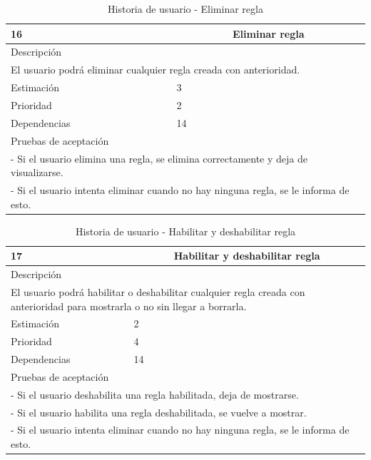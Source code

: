 \begin{table}[H]
	\begin{center}
		\begin{tabular} {|l|c|l|}
			\hline
			16 & \multicolumn{2}{c|}{Eliminar regla} \\ \hline \hline
			\multicolumn{3}{|l|}{Descripción} \\ \hline
			\multicolumn{3}{|p{12cm}|}{El usuario podrá eliminar cualquier regla creada con anterioridad.} \\ \hline
			\multicolumn{2}{|l|}{Estimación} & 3 \\ \hline
			\multicolumn{2}{|l|}{Prioridad} & 2 \\ \hline
			\multicolumn{2}{|l|}{Dependencias} & 14 \\ \hline
			\multicolumn{3}{|l|}{Pruebas de aceptación} \\ \hline
			\multicolumn{3}{|p{12cm}|}{ - Si el usuario elimina una regla, se elimina correctamente y deja de visualizarse.} \\
			\multicolumn{3}{|p{12cm}|}{ - Si el usuario intenta eliminar cuando no hay ninguna regla, se le informa de esto.} \\ \hline
		\end{tabular}
	\end{center}
	\caption{Historia de usuario - Eliminar regla}
	\label{tab:hu_eliminar_regla}
\end{table}

\begin{table}[H]
	\begin{center}
		\begin{tabular} {|l|c|l|}
			\hline
			17 & \multicolumn{2}{c|}{Habilitar y deshabilitar regla} \\ \hline \hline
			\multicolumn{3}{|l|}{Descripción} \\ \hline
			\multicolumn{3}{|p{12cm}|}{El usuario podrá habilitar o deshabilitar cualquier regla creada con anterioridad para mostrarla o no sin llegar a borrarla.} \\ \hline
			\multicolumn{2}{|l|}{Estimación} & 2 \\ \hline
			\multicolumn{2}{|l|}{Prioridad} & 4 \\ \hline
			\multicolumn{2}{|l|}{Dependencias} & 14 \\ \hline
			\multicolumn{3}{|l|}{Pruebas de aceptación} \\ \hline
			\multicolumn{3}{|p{12cm}|}{ - Si el usuario deshabilita una regla habilitada, deja de mostrarse.} \\
			\multicolumn{3}{|p{12cm}|}{ - Si el usuario habilita una regla deshabilitada, se vuelve a mostrar.} \\
			\multicolumn{3}{|p{12cm}|}{ - Si el usuario intenta eliminar cuando no hay ninguna regla, se le informa de esto.} \\ \hline
		\end{tabular}
	\end{center}
	\caption{Historia de usuario - Habilitar y deshabilitar regla}
	\label{tab:hu_habilitar_y_deshabilitar_regla}
\end{table}

